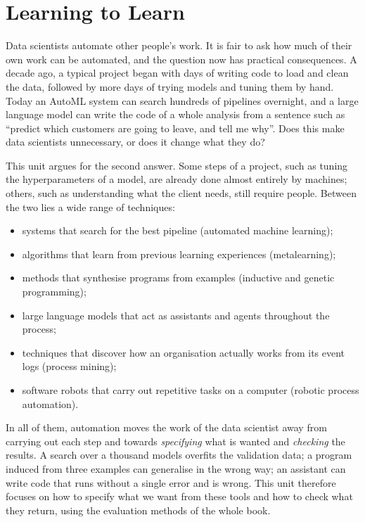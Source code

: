 \chapter{Learning to Learn}\label{ch:learning}

Data scientists automate other people's work. It is fair to ask how much of their own work can be
automated, and the question now has practical consequences. A decade ago, a typical project began with days of
writing code to load and clean the data, followed by more days of trying models and tuning them by hand.
Today an AutoML system can search hundreds of pipelines overnight, and a large language model can write the
code of a whole analysis from a sentence such as ``predict which customers are going to leave, and tell me
why''. Does this make data scientists unnecessary, or does it change what they do?

This unit argues for the second answer. Some steps of a project, such as tuning the hyperparameters of a
model, are already done almost entirely by machines; others, such as understanding what the client needs, still require people. Between the two lies a wide range of techniques: \begin{itemize}
\item systems that search for the
best pipeline (automated machine learning);
\item algorithms that learn from previous learning experiences
(metalearning);
\item methods that synthesise programs from examples (inductive and genetic programming);
\item large
language models that act as assistants and agents throughout the process;
\item techniques that discover how an
organisation actually works from its event logs (process mining);
\item software robots that carry out
repetitive tasks on a computer (robotic process automation).
\end{itemize}

In all of them, automation moves the work of the data scientist away from carrying out each step and towards
\emph{specifying} what is wanted and \emph{checking} the results. A search over a thousand models overfits the validation data; a program
induced from three examples can generalise in the wrong way; an assistant can write code that runs without a
single error and is wrong. This unit therefore focuses on how to specify what we want from these tools and how to check what they return, using
the evaluation methods of the whole book.

